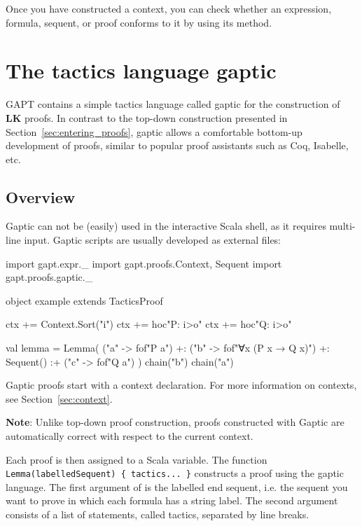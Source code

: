 \documentclass[a4paper,11pt]{book}
\newcommand{\LK}{\textbf{LK}}
\newcommand{\cli}[1]{{\ttfamily {#1}}}
\begin{document}
Once you have constructed a context, you can check whether an expression, formula, sequent, or proof conforms to it by using its \cli{check} method.

\section{The tactics language gaptic}\label{sec:gaptic}

GAPT contains a simple tactics language called gaptic for the construction of {\LK} proofs.
In contrast to the top-down construction presented in Section~\ref{sec:entering_proofs},
gaptic allows a comfortable bottom-up development of proofs, similar
to popular proof assistants such as Coq, Isabelle, etc.

\subsection{Overview}

Gaptic can not be (easily) used in the interactive Scala shell, as it requires
multi-line input.  Gaptic scripts are usually developed as external files:
\begin{tacticslisting}
import gapt.expr._
import gapt.proofs.{Context, Sequent}
import gapt.proofs.gaptic._

object example extends TacticsProof {
  ctx += Context.Sort("i")
  ctx += hoc"P: i>o"
  ctx += hoc"Q: i>o"

  val lemma = Lemma(
    ("a" -> fof"P a") +:
    ("b" -> fof"∀x (P x → Q x)") +:
    Sequent()
    :+ ("c" -> fof"Q a")
  ) {
    chain("b")
    chain("a")
  }
}
\end{tacticslisting}
\begin{tacticsoutput}
\end{tacticsoutput}

Gaptic proofs start with a context declaration. For more information on
contexts, see Section~\ref{sec:context}.

\textbf{Note}: Unlike top-down proof construction, proofs constructed with Gaptic
are automatically correct with respect to the current context.

Each proof is then assigned to a Scala variable.  The function
\verb,Lemma(labelledSequent) { tactics... }, constructs a proof using the
gaptic language.  The first argument of \cli{Lemma} is the labelled end
sequent, i.e. the sequent you want to prove in which each formula has a string
label.  The second argument consists of a list of statements, called tactics,
separated by line breaks.
\end{document}
